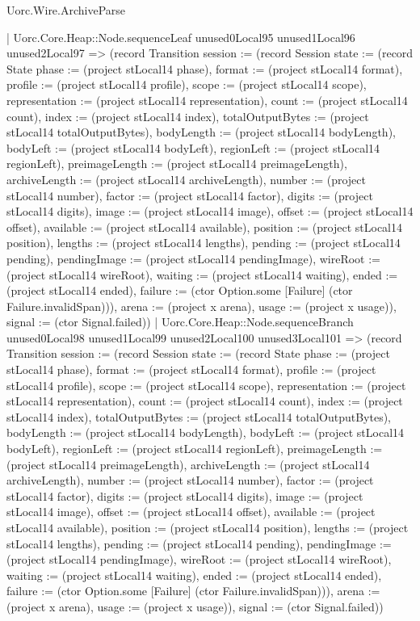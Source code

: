 \begin{lexlean}{Uorc.Wire.ArchiveParse}
\begin{semanticmodule}
{            | Uorc.Core.Heap::Node.sequenceLeaf unused0Local95 unused1Local96 unused2Local97 => (record Transition {session := (record Session {state := (record State {phase := (project stLocal14 phase), format := (project stLocal14 format), profile := (project stLocal14 profile), scope := (project stLocal14 scope), representation := (project stLocal14 representation), count := (project stLocal14 count), index := (project stLocal14 index), totalOutputBytes := (project stLocal14 totalOutputBytes), bodyLength := (project stLocal14 bodyLength), bodyLeft := (project stLocal14 bodyLeft), regionLeft := (project stLocal14 regionLeft), preimageLength := (project stLocal14 preimageLength), archiveLength := (project stLocal14 archiveLength), number := (project stLocal14 number), factor := (project stLocal14 factor), digits := (project stLocal14 digits), image := (project stLocal14 image), offset := (project stLocal14 offset), available := (project stLocal14 available), position := (project stLocal14 position), lengths := (project stLocal14 lengths), pending := (project stLocal14 pending), pendingImage := (project stLocal14 pendingImage), wireRoot := (project stLocal14 wireRoot), waiting := (project stLocal14 waiting), ended := (project stLocal14 ended), failure := (ctor Option.some [Failure] (ctor Failure.invalidSpan))}), arena := (project x arena), usage := (project x usage)}), signal := (ctor Signal.failed)})
            | Uorc.Core.Heap::Node.sequenceBranch unused0Local98 unused1Local99 unused2Local100 unused3Local101 => (record Transition {session := (record Session {state := (record State {phase := (project stLocal14 phase), format := (project stLocal14 format), profile := (project stLocal14 profile), scope := (project stLocal14 scope), representation := (project stLocal14 representation), count := (project stLocal14 count), index := (project stLocal14 index), totalOutputBytes := (project stLocal14 totalOutputBytes), bodyLength := (project stLocal14 bodyLength), bodyLeft := (project stLocal14 bodyLeft), regionLeft := (project stLocal14 regionLeft), preimageLength := (project stLocal14 preimageLength), archiveLength := (project stLocal14 archiveLength), number := (project stLocal14 number), factor := (project stLocal14 factor), digits := (project stLocal14 digits), image := (project stLocal14 image), offset := (project stLocal14 offset), available := (project stLocal14 available), position := (project stLocal14 position), lengths := (project stLocal14 lengths), pending := (project stLocal14 pending), pendingImage := (project stLocal14 pendingImage), wireRoot := (project stLocal14 wireRoot), waiting := (project stLocal14 waiting), ended := (project stLocal14 ended), failure := (ctor Option.some [Failure] (ctor Failure.invalidSpan))}), arena := (project x arena), usage := (project x usage)}), signal := (ctor Signal.failed)})
}
\end{semanticmodule}
\end{lexlean}
